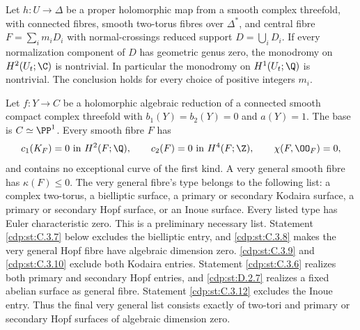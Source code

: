 \begin{proposition}\hypertarget{tag-01GA}{}\label{cdp:st:D.2.3}



Let $h:U\to\Delta$ be a proper holomorphic map from a smooth
complex threefold, with connected fibres, smooth two-torus fibres
over $\Delta^*$, and central fibre $F=\sum_i m_iD_i$ with
normal-crossings reduced support $D=\bigcup_iD_i$.
If every normalization component of $D$ has geometric genus zero,
the monodromy on $H^2(U_t;\C)$ is nontrivial. In particular the
monodromy on $H^1(U_t;\Q)$ is nontrivial. The conclusion holds for every choice of positive integers $m_i$.
\end{proposition}

\begin{proposition}\hypertarget{tag-01F4}{}\label{cdp:st:C.3.1}


Let $f:Y\to C$ be a holomorphic algebraic reduction of a connected
smooth compact complex threefold with $b_1(Y)=b_2(Y)=0$ and $a(Y)=1$.
The base is $C\simeq\PP^1$. Every smooth fibre $F$ has
\[
 c_1(K_F)=0\text{ in }H^2(F;\Q),\qquad
 c_2(F)=0\text{ in }H^4(F;\Z),\qquad
 \chi(F,\OO_F)=0,
\]
and contains no exceptional curve of the first kind. A very general
smooth fibre has $\kappa(F)\leq0$. The very general fibre's type belongs to the following
list: a complex two-torus, a bielliptic surface, a primary or secondary
Kodaira surface, a primary or secondary Hopf surface, or an Inoue
surface. Every listed type has Euler characteristic zero. This is a
preliminary necessary list. Statement \ref{cdp:st:C.3.7} below excludes the
bielliptic entry, and \ref{cdp:st:C.3.8} makes the very general Hopf fibre have
algebraic dimension zero. \ref{cdp:st:C.3.9} and \ref{cdp:st:C.3.10} exclude both Kodaira
entries. Statement \ref{cdp:st:C.3.6} realizes both primary and secondary Hopf
entries, and \ref{cdp:st:D.2.7} realizes a fixed abelian surface as general
fibre. Statement \ref{cdp:st:C.3.12} excludes the Inoue entry. Thus the
final very general list consists exactly of two-tori and
primary or secondary Hopf surfaces of algebraic dimension zero.
\end{proposition}

